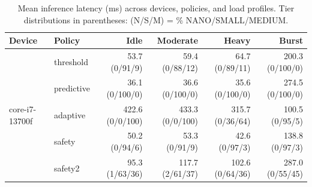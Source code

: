 \begin{table}[t]
\centering
\caption{Mean inference latency (ms) across devices, policies, and load profiles. Tier distributions in parentheses: (N/S/M) = \% NANO/SMALL/MEDIUM.}
\label{tab:multidevice}
\begin{tabular}{llrrrr}
\toprule
Device & Policy & Idle & Moderate & Heavy & Burst \\
\midrule
\multirow{5}{*}{core-i7-13700f} & threshold & 53.7 (0/91/9) & 59.4 (0/88/12) & 64.7 (0/89/11) & 200.3 (0/100/0) \\
 & predictive & 36.1 (0/100/0) & 36.6 (0/100/0) & 35.6 (0/100/0) & 274.5 (0/100/0) \\
 & adaptive & 422.6 (0/0/100) & 433.3 (0/0/100) & 315.7 (0/36/64) & 100.5 (0/95/5) \\
 & safety & 50.2 (0/94/6) & 53.3 (0/91/9) & 42.6 (0/97/3) & 138.8 (0/97/3) \\
 & safety2 & 95.3 (1/63/36) & 117.7 (2/61/37) & 102.6 (0/64/36) & 287.0 (0/55/45) \\
\bottomrule
\end{tabular}
\end{table}